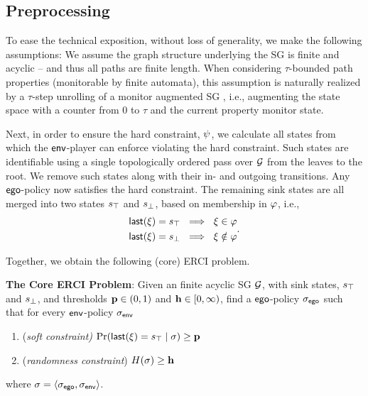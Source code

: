 {{{\subsection{Preprocessing}
To ease the technical exposition, without loss of generality, we make
the following assumptions:
We assume the graph
structure underlying the SG is finite and acyclic -- and thus all paths
are finite length. When considering $\tau$-bounded path properties (monitorable by finite automata),
this assumption is naturally realized by a $\tau$-step unrolling of a
monitor augmented SG \footnotemark, i.e., augmenting the state space with a counter from $0$ to $\tau$ and the current property monitor state.


Next, in order to ensure the hard constraint, $\psi$, we
calculate all states from which the $\mathsf{env}$-player can enforce
violating the hard constraint. Such states are identifiable using a single
topologically ordered pass over $\mathcal{G}$ from the leaves to the root.  We remove
such states along with their in- and outgoing transitions. Any
$\mathsf{ego}$-policy now satisfies the hard constraint. 
The remaining sink states are all merged into two states $s_{\top}$ and
$s_{\bot}$, based on membership in $\varphi$, i.e.,
\begin{equation}
  \begin{split}
    \mathsf{last}({\xi}) = s_{\top} ~\implies~ \xi \in \varphi\\
    \mathsf{last}({\xi}) = s_{\bot} ~\implies~ \xi \notin \varphi
  \end{split}.
\end{equation}

\noindent 
Together, we obtain the following (core) ERCI problem.
\begin{mdframed}[nobreak=true]
\textbf{The Core ERCI Problem}:
Given an finite acyclic SG $\mathcal{G}$, with sink states, $s_{\top}$ and $s_{\bot}$, and thresholds $\mathbf{p} \in (0,1)$ and $\mathbf{h} \in [0,\infty)$,  find a $\mathsf{ego}$-policy ${\sigma_{\mathsf{ego}}}$  such that for every $\mathsf{env}$-policy ${\sigma_{\mathsf{env}}}$
\begin{enumerate}
\item (\emph{soft constraint)}
  $\Pr(\mathsf{last}({\xi}) = s_{\top} \mid \sigma) \geq \mathbf{p}$
\item (\emph{randomness constraint}) $H(\sigma) \geq \mathbf{h}$
\end{enumerate}
where  $\sigma = \langle {\sigma_{\mathsf{ego}}}, {\sigma_{\mathsf{env}}} \rangle$.
\end{mdframed}

}}}

